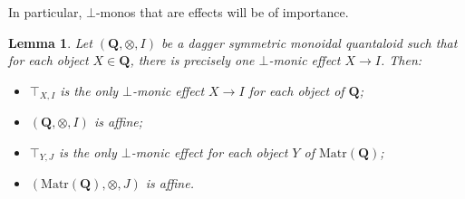 \documentclass[12pt]{tac}
\newtheorem{lemma}[theorem]{Lemma}
\theoremstyle{definition}
\theoremstyle{remark}
\newcommand{\<}{\langle}
\renewcommand{\>}{\rangle}
\renewcommand{\:}{\colon}
\begin{document}
In particular, $\bot$-monos that are effects will be of importance.
\begin{lemma}\label{lem:unique-zero-monic-effects-in-MatrQ}
    Let $(\mathbf{Q},\otimes, I)$ be a dagger symmetric monoidal quantaloid such that for each object $X\in\mathbf Q$, there is precisely one $\bot$-monic effect $X\to I$. Then:
    \begin{itemize}
    \item[(a)] $\top_{X,I}$ is the only $\bot$-monic effect $X\to I$ for each object of $\mathbf Q$;
    \item[(b)] $(\mathbf Q,\otimes, I)$ is affine;
    \item[(c)] $\top_{Y,J}$ is the only $\bot$-monic effect for each object $Y$ of $\mathrm{Matr}(\mathbf Q)$;
    \item[(d)] $(\mathrm{Matr}(\mathbf Q),\otimes,J)$ is affine.
    \end{itemize}
\end{lemma}
\end{document}
